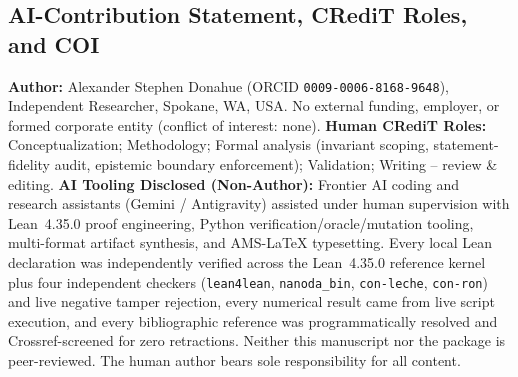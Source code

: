 \documentclass[11pt,reqno]{amsart}
\theoremstyle{plain}
\theoremstyle{definition}
\theoremstyle{remark}
\newcommand{\code}[1]{{\footnotesize\nolinkurl{#1}}}
\begin{document}
\subsection{AI-Contribution Statement, CRediT Roles, and COI}
\textbf{Author:} Alexander Stephen Donahue (ORCID \code{0009-0006-8168-9648}), Independent Researcher, Spokane, WA, USA. No external funding, employer, or formed corporate entity (conflict of interest: none). \textbf{Human CRediT Roles:} Conceptualization; Methodology; Formal analysis (invariant scoping, statement-fidelity audit, epistemic boundary enforcement); Validation; Writing -- review \& editing. \textbf{AI Tooling Disclosed (Non-Author):} Frontier AI coding and research assistants (Gemini / Antigravity) assisted under human supervision with Lean~4.35.0 proof engineering, Python verification/oracle/mutation tooling, multi-format artifact synthesis, and AMS-LaTeX typesetting. Every local Lean declaration was independently verified across the Lean~4.35.0 reference kernel plus four independent checkers (\code{lean4lean}, \code{nanoda_bin}, \code{con-leche}, \code{con-ron}) and live negative tamper rejection, every numerical result came from live script execution, and every bibliographic reference was programmatically resolved and Crossref-screened for zero retractions. Neither this manuscript nor the package is peer-reviewed. The human author bears sole responsibility for all content.



\end{document}
